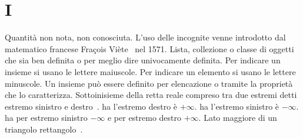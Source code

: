 \chapter{I}
\vspace{5mm} 
Quantità non nota, non conosciuta. L'uso delle incognite venne introdotto dal matematico francese Fraçois Viète\pointsto~ nel 1571.
Lista, collezione o classe di oggetti
che sia ben definita o per meglio dire univocamente definita. Per indicare un insieme si usano le lettere maiuscole. Per indicare un elemento si usano le lettere minuscole. Un insieme può essere definito per elencazione o tramite la proprietà che lo caratterizza.\cite{Lipschutz1980}
Sottoinisieme della retta reale compreso tra due estremi detti estremo sinistro e destro\pointsto~. ha l'estremo destro è $+\infty$.  ha l'estremo sinistro è $-\infty$. ha per estremo sinistro $-\infty$ e per estremo destro $+\infty$.
Lato maggiore di un triangolo rettangolo\pointsto~.

